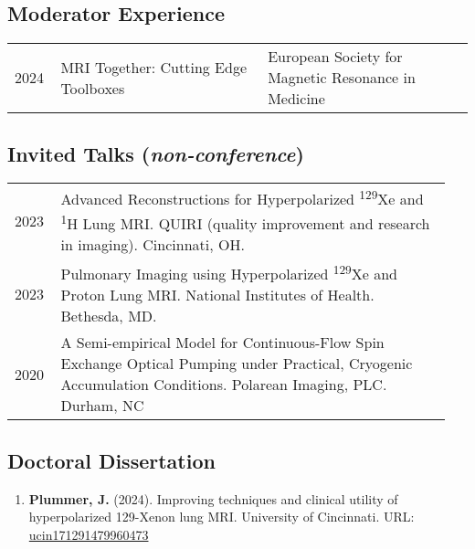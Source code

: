 \documentclass[12pt,]{scrartcl}
\begin{document}
\newpage

\subsection{Moderator Experience}\label{moderator}

\begin{table}[!h]
{\def\arraystretch{1.5}\tabcolsep=0pt
\begin{tabular}{p{0.10\linewidth}p{0.45\linewidth}p{0.45\linewidth}}

2024 & MRI Together: Cutting Edge Toolboxes & European Society for Magnetic Resonance in Medicine \\

\end{tabular}%
}
\end{table}


\subsection{Invited Talks (\textit{non-conference})}\label{presentations-and-talks}

\begin{table}[!h]
{\def\arraystretch{1.5}\tabcolsep=0pt
\begin{tabular}{p{0.10\linewidth}p{0.85\linewidth}}
  
  2023 & Advanced Reconstructions for Hyperpolarized \textsuperscript{129}Xe and \textsuperscript{1}H Lung MRI. QUIRI (quality improvement and research in imaging). Cincinnati, OH. \\

  2023 & Pulmonary Imaging using Hyperpolarized \textsuperscript{129}Xe and Proton Lung MRI. National Institutes of Health. Bethesda, MD. \\

  2020 & A Semi-empirical Model for Continuous-Flow Spin Exchange Optical Pumping under Practical, Cryogenic Accumulation Conditions. Polarean Imaging, PLC. Durham, NC \\

    
  
\end{tabular}%
}
\end{table}

\subsection{Doctoral Dissertation}\label{dissertation}
\begin{enumerate}
    \leftskip-0.13in
    \item \textbf{Plummer, J.} (2024). Improving techniques and clinical utility of hyperpolarized 129-Xenon lung MRI. University of Cincinnati. URL: \href{http://rave.ohiolink.edu/etdc/view?acc_num=ucin171291479960473}{ucin171291479960473}
    
\end{enumerate}
\end{document}
